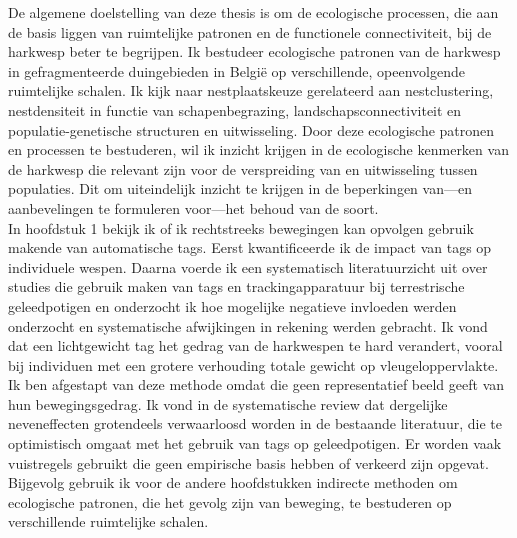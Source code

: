 \documentclass[10pt, twoside]{book} %
\begin{document}
  De algemene doelstelling van deze thesis is om de ecologische processen, die aan de basis liggen van ruimtelijke patronen en de functionele connectiviteit, bij de harkwesp beter te begrijpen. Ik bestudeer ecologische patronen van de harkwesp in gefragmenteerde duingebieden in België op verschillende, opeenvolgende ruimtelijke schalen. Ik kijk naar nestplaatskeuze gerelateerd aan nestclustering, nestdensiteit in functie van schapenbegrazing, landschapsconnectiviteit en populatie-genetische structuren en uitwisseling. Door deze ecologische patronen en processen te bestuderen, wil ik inzicht krijgen in de ecologische kenmerken van de harkwesp die relevant zijn voor de verspreiding van en uitwisseling tussen populaties. Dit om uiteindelijk inzicht te krijgen in de beperkingen van---en aanbevelingen te formuleren voor---het behoud van de soort.\\
  
  In hoofdstuk 1 bekijk ik of ik rechtstreeks bewegingen kan opvolgen gebruik makende van automatische tags. Eerst kwantificeerde ik de impact van tags op individuele wespen. Daarna voerde ik een systematisch literatuurzicht uit over studies die gebruik maken van tags en trackingapparatuur bij terrestrische geleedpotigen en onderzocht ik hoe mogelijke negatieve invloeden werden onderzocht en systematische afwijkingen in rekening werden gebracht. Ik vond dat een lichtgewicht tag het gedrag van de harkwespen te hard verandert, vooral bij individuen met een grotere verhouding totale gewicht op vleugeloppervlakte. Ik ben afgestapt van deze methode omdat die geen representatief beeld geeft van hun bewegingsgedrag. Ik vond in de systematische review dat dergelijke neveneffecten grotendeels verwaarloosd worden in de bestaande literatuur, die te optimistisch omgaat met het gebruik van tags op geleedpotigen. Er worden vaak vuistregels gebruikt die geen empirische basis hebben of verkeerd zijn opgevat. Bijgevolg gebruik ik voor de andere hoofdstukken indirecte methoden om ecologische patronen, die het gevolg zijn van beweging, te bestuderen op verschillende ruimtelijke schalen.\\
  
\end{document}
